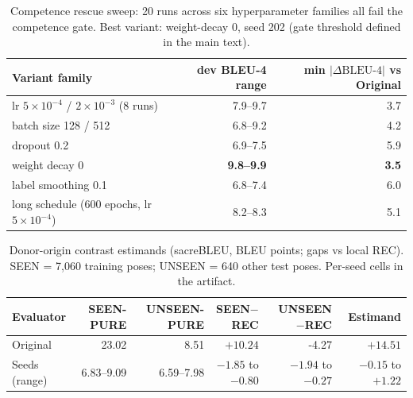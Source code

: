 \documentclass[pdflatex,sn-chicago]{sn-jnl}
\begin{document}
\begin{table}[h]
\centering
\small
\caption{Competence rescue sweep: 20 runs across six hyperparameter families all fail the competence gate. Best variant: weight-decay 0, seed 202 (gate threshold defined in the main text).}
\label{tab:s8_rescue_dev}
\begin{tabular}{lrr}
\toprule
Variant family & dev BLEU-4 range & min $|\Delta\text{BLEU-4}|$ vs Original \\
\midrule
lr $5\times10^{-4}$ / $2\times10^{-3}$ (8 runs) & 7.9--9.7 & 3.7 \\
batch size 128 / 512 & 6.8--9.2 & 4.2 \\
dropout 0.2 & 6.9--7.5 & 5.9 \\
weight decay 0 & \textbf{9.8--9.9} & \textbf{3.5} \\
label smoothing 0.1 & 6.8--7.4 & 6.0 \\
long schedule (600 epochs, lr $5\times10^{-4}$) & 8.2--8.3 & 5.1 \\
\bottomrule
\end{tabular}
\end{table}

\begin{table}[h]
\centering
\scriptsize\setlength{\tabcolsep}{3pt}
\caption{Donor-origin contrast estimands (sacreBLEU, BLEU points; gaps vs local REC). SEEN = 7,060 training poses; UNSEEN = 640 other test poses. Per-seed cells in the artifact.}
\label{tab:s9_exposure_estimands}
\begin{tabular}{lrrrrr}
\toprule
Evaluator & SEEN-PURE & UNSEEN-PURE & SEEN$-$REC & UNSEEN$-$REC & Estimand \\
\midrule
Original & 23.02 & 8.51 & $+10.24$ & -4.27 & $\mathbf{+14.51}$ \\
Seeds (range) & 6.83--9.09 & 6.59--7.98 & $-1.85$ to $-0.80$ & $-1.94$ to $-0.27$ & $-0.15$ to $+1.22$ \\
\bottomrule
\end{tabular}
\end{table}
\end{document}
